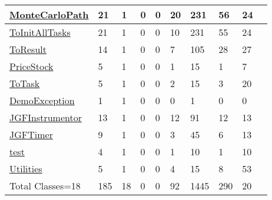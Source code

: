 \documentclass[10pt]{article}
\begin{document}
\begin{longtable}{|l|l|l|l|l|l|l|l|l|l|}
\hline
\hyperref[MonteCarloPath]{\color{Fuchsia}MonteCarloPath}&21&1&0&0&20&231&56&24\\
\hline
\hyperref[ToInitAllTasks]{\color{Fuchsia}ToInitAllTasks}&21&1&0&0&10&231&55&24\\
\hline
\hyperref[ToResult]{\color{Fuchsia}ToResult}&14&1&0&0&7&105&28&27\\
\hline
\hyperref[PriceStock]{\color{Fuchsia}PriceStock}&5&1&0&0&1&15&1&7\\
\hline
\hyperref[ToTask]{\color{Fuchsia}ToTask}&5&1&0&0&2&15&3&20\\
\hline
\hyperref[DemoException]{\color{Fuchsia}DemoException}&1&1&0&0&0&1&0&0\\
\hline
\hyperref[JGFInstrumentor]{\color{Fuchsia}JGFInstrumentor}&13&1&0&0&12&91&12&13\\
\hline
\hyperref[JGFTimer]{\color{Fuchsia}JGFTimer}&9&1&0&0&3&45&6&13\\
\hline
\hyperref[test]{\color{Fuchsia}test}&4&1&0&0&1&10&1&10\\
\hline
\hyperref[Utilities]{\color{Fuchsia}Utilities}&5&1&0&0&4&15&8&53\\
\hline
Total Classes=18&185&18&0&0&92&1445&290&20\\
\hline
\end{longtable}
\newpage
\tableofcontents
\newpage
\end{document}
